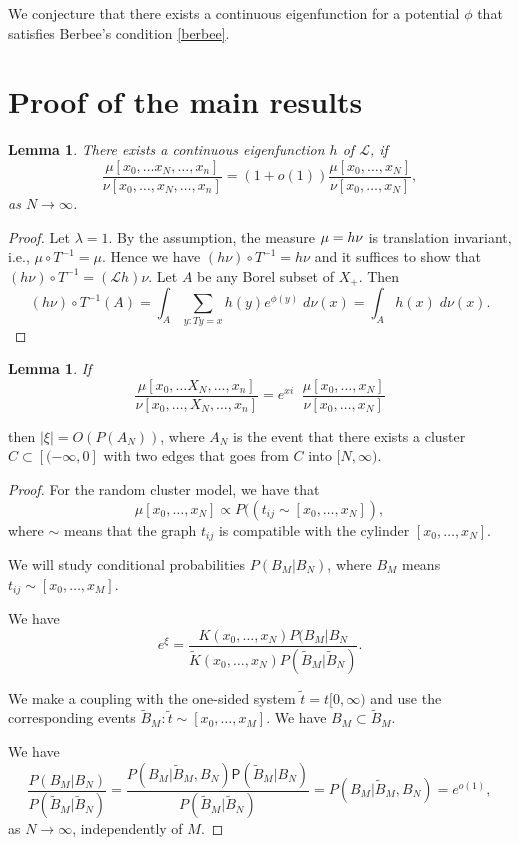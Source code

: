 \documentclass[11pt, a4paper, oneside]{article}
\newtheorem{lem}[thm]{Lemma}
\theoremstyle{definition}
\theoremstyle{remark}
\renewcommand{\P}{\mathsf{P}}
\providecommand{\tl}{\tilde}
\begin{document}
We conjecture that there exists a continuous eigenfunction for a potential
$\phi$ that satisfies Berbee's condition \eqref{berbee}.

\section{Proof of the main results}\noindent
\begin{lem}
  There exists a continuous eigenfunction $h$ of ${\mathcal L}$, if
$$\frac{\mu[x_0,\ldots x_N, \ldots, x_n]}{\nu[x_0,\ldots, x_N, \ldots, x_n]}=(1+o(1)) \frac{\mu[x_0,\ldots, x_N]}{\nu[x_0, \ldots, x_N]},$$
as $N\to \infty$.
\end{lem}
\begin{proof}
  Let $\lambda=1$. By the assumption, the measure $\mu= h \nu$ is translation
  invariant, i.e., $\mu\circ T^{-1}=\mu$. Hence we have $(h\nu)\circ
  T^{-1}=h\nu$ and it suffices to show that $(h\nu)\circ T^{-1}=({\mathcal
    L}h)\nu$. Let $A$ be any Borel subset of $X_+$. Then
$$(h\nu)\circ T^{-1} (A)=\int_A \sum_{y: Ty=x} h(y)e^{\phi(y)}\; d\nu(x)=\int_A h(x)\; d\nu(x).$$
\end{proof}

\begin{lem}
  If $$\frac{\mu[x_0,\ldots X_N, \ldots, x_n]}{\nu[x_0,\ldots, X_N, \ldots,
    x_n]}=e^{xi}\; \; \frac{\mu[x_0,\ldots, x_N]}{\nu[x_0, \ldots, x_N]}$$
\end{lem}
then $|\xi|=O(P(A_N))$, where $A_N$ is the event that there exists a cluster
$C\subset [(-\infty, 0]$ with two edges that goes from $C$ into $[N,\infty)$.
\begin{proof}
  For the random cluster model, we have that
$$\mu[x_0,\ldots, x_N]\propto P((t_{ij} \sim [x_0, \ldots, x_N]),$$
where $\sim$ means that the graph $t_{ij}$ is compatible with the cylinder
$[x_0,\ldots, x_N]$.

We will study conditional probabilities $P(B_M|B_N)$, where $B_M$ means
$t_{ij}\sim [x_0,\ldots, x_M]$.

We have
$$e^{\xi}=\frac{K(x_0,\ldots, x_N)P(B_M|B_N}{\tl K(x_0,\ldots, x_N)P(\tilde B_M|\tilde B_N)}.$$

We make a coupling with the one-sided system $\tilde t=t[0,\infty)$ and use the
corresponding events $\tilde B_M: \tilde t \sim [x_0,\ldots, x_M]$. We have
$B_M\subset \tilde B_M$.

We have
$$ 
\frac{P(B_M|B_N)}{P(\tilde B_M| \tilde B_N)}= \frac{P(B_M|\tilde B_M, B_N)
  \P(\tilde B_M|B_N)} {P(\tilde B_M|\tilde B_N)}=P(B_M|\tilde B_M,
B_N)=e^{o(1)},
$$
as $N\to \infty$, independently of $M$.
\end{proof}
\end{document}
